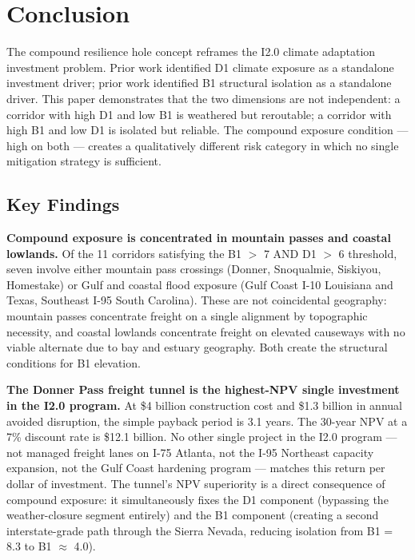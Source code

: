 \section{Conclusion}

The compound resilience hole concept reframes the I2.0 climate adaptation investment problem. Prior work \citep{ROUTE_D1} identified D1 climate exposure as a standalone investment driver; prior work \citep{ROUTE_B1} identified B1 structural isolation as a standalone driver. This paper demonstrates that the two dimensions are not independent: a corridor with high D1 and low B1 is weathered but reroutable; a corridor with high B1 and low D1 is isolated but reliable. The compound exposure condition --- high on both --- creates a qualitatively different risk category in which no single mitigation strategy is sufficient.

\subsection*{Key Findings}

\textbf{Compound exposure is concentrated in mountain passes and coastal lowlands.} Of the 11 corridors satisfying the B1 $>$ 7 AND D1 $>$ 6 threshold, seven involve either mountain pass crossings (Donner, Snoqualmie, Siskiyou, Homestake) or Gulf and coastal flood exposure (Gulf Coast I-10 Louisiana and Texas, Southeast I-95 South Carolina). These are not coincidental geography: mountain passes concentrate freight on a single alignment by topographic necessity, and coastal lowlands concentrate freight on elevated causeways with no viable alternate due to bay and estuary geography. Both create the structural conditions for B1 elevation.

\textbf{The Donner Pass freight tunnel is the highest-NPV single investment in the I2.0 program.} At \$4 billion construction cost and \$1.3 billion in annual avoided disruption, the simple payback period is 3.1 years. The 30-year NPV at a 7\% discount rate is \$12.1 billion. No other single project in the I2.0 program --- not managed freight lanes on I-75 Atlanta, not the I-95 Northeast capacity expansion, not the Gulf Coast hardening program --- matches this return per dollar of investment. The tunnel's NPV superiority is a direct consequence of compound exposure: it simultaneously fixes the D1 component (bypassing the weather-closure segment entirely) and the B1 component (creating a second interstate-grade path through the Sierra Nevada, reducing isolation from B1 = 8.3 to B1 $\approx$ 4.0).

